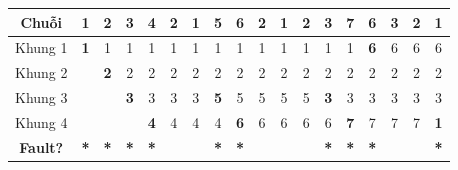 \documentclass[11pt,a4paper]{article}
\begin{document}
\begin{table}[h!]
\centering
\scriptsize
\begin{tabular}{|c|c|c|c|c|c|c|c|c|c|c|c|c|c|c|c|c|c|}
\hline
\textbf{Chuỗi} & \textbf{1} & \textbf{2} & \textbf{3} & \textbf{4} & \textbf{2} & \textbf{1} & \textbf{5} & \textbf{6} & \textbf{2} & \textbf{1} & \textbf{2} & \textbf{3} & \textbf{7} & \textbf{6} & \textbf{3} & \textbf{2} & \textbf{1} \\ \hline
Khung 1 & \textbf{1} & 1 & 1 & 1 & 1 & 1 & 1 & 1 & 1 & 1 & 1 & 1 & 1 & \textbf{6} & 6 & 6 & 6 \\ \hline
Khung 2 &   & \textbf{2} & 2 & 2 & 2 & 2 & 2 & 2 & 2 & 2 & 2 & 2 & 2 & 2 & 2 & 2 & 2 \\ \hline
Khung 3 &   &   & \textbf{3} & 3 & 3 & 3 & \textbf{5} & 5 & 5 & 5 & 5 & \textbf{3} & 3 & 3 & 3 & 3 & 3 \\ \hline
Khung 4 &   &   &   & \textbf{4} & 4 & 4 & 4 & \textbf{6} & 6 & 6 & 6 & 6 & \textbf{7} & 7 & 7 & 7 & \textbf{1} \\ \hline
\textbf{Fault?} & \textbf{*} & \textbf{*} & \textbf{*} & \textbf{*} & & & \textbf{*} & \textbf{*} & & & & \textbf{*} & \textbf{*} & \textbf{*} & & & \textbf{*} \\ \hline
\end{tabular}
\end{table}
\end{document}
